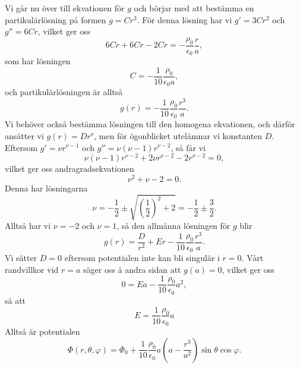 \documentclass[%
oneside,                 %
final,                   %
10pt]{article}
\newenvironment{doconceexercise}{}{}
\begin{document}
\begin{doconceexercise}
Vi går nu över till ekvationen för $g$ och börjar med att bestämma
en partikulärlösning på formen $g = Cr^3$.  För denna lösning
har vi $g' = 3Cr^2$ och $g'' = 6Cr$, vilket ger oss
\begin{equation}
  6Cr + 6Cr -2Cr = - \frac{\rho_0}{\epsilon_0} \frac{r}{a},
\end{equation}
som har lösningen
\begin{equation}
  C = - \frac{1}{10} \frac{\rho_0}{\epsilon_0 a},
\end{equation}
och partikulärlösningen är alltså
\begin{equation}
  g\left(r\right) = - \frac{1}{10} \frac{\rho_0}{\epsilon_0} \frac{r^3}{a}.
\end{equation}
Vi behöver också bestämma lösningen till den homogena ekvationen,
och därför ansätter vi $g(r) = Dr^\nu$, men för ögonblicket 
utelämnar vi konstanten $D$.  Eftersom $g' = \nu r^{\nu-1}$ och $g'' = \nu
(\nu-1) r^{\nu-2}$, så får vi
\begin{equation}
  \nu \left(\nu-1\right) r^{\nu-2} + 2\nu r^{\nu-2} -2r^{\nu-2} = 0,
\end{equation}
vilket ger oss andragradsekvationen
\begin{equation}
  \nu^2 + \nu -2 = 0.
\end{equation}
Denna har lösningarna
\begin{equation}
  \nu = - \frac{1}{2} \pm \sqrt{\left(\frac{1}{2}\right)^2+2} = -\frac{1}{2}
\pm \frac{3}{2}.
\end{equation}
Alltså har vi $\nu = -2$ och $\nu = 1$, så den allmänna lösningen 
för $g$ blir
\begin{equation}
  g\left(r\right) = \frac{D}{r^2} + Er - \frac{1}{10} \frac{\rho_0}{\epsilon_0}
\frac{r^3}{a}.
\end{equation}
Vi sätter $D = 0$ eftersom potentialen inte kan bli singulär i $r = 0$.
Vårt randvillkor vid $r = a$ säger oss å andra sidan att $g(a) = 0$,
vilket ger oss
\begin{equation}
  0 = Ea - \frac{1}{10} \frac{\rho_0}{\epsilon_0}a^2,
\end{equation}
så att
\begin{equation}
  E = \frac{1}{10} \frac{\rho_0}{\epsilon_0} a
\end{equation}
Alltså är potentialen
\begin{equation}
  \Phi\left(r,\theta,\varphi\right) = \Phi_0 + \frac{1}{10} 
\frac{\rho_0}{\epsilon_0} a \left(a - \frac{r^3}{a^2}\right) \sin \theta
\cos \varphi.
\end{equation}

\end{doconceexercise}
\end{document}
